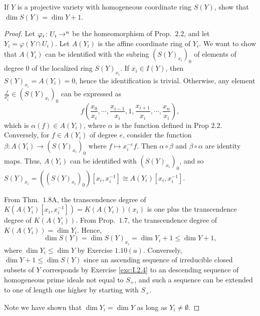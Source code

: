 \documentclass[10pt]{article}
\theoremstyle{definition}
\theoremstyle{remark}
\numberwithin{equation}{section}
\numberwithin{figure}{subsubsection}
\let\AA\relax
\DeclareMathOperator{\AA}{\mathbf{A}}
\begin{document}
\begin{problem}\label{exc:I.2.6}
  If $Y$ is a projective variety with homogeneous coordinate ring $S(Y)$, show that $\dim S(Y) = \dim Y + 1$. 
\end{problem}
\begin{proof}
  Let $\varphi_i\colon U_i \to \AA^n$ be the homeomorphism of Prop.~$2.2$, and
  let $Y_i = \varphi(Y \cap U_i)$.
  Let $A(Y_i)$ is the affine coordinate ring of $Y_i$.
  We want to show that $A(Y_i)$ can be identified with the subring
  $(S(Y)_{x_i})_0$ of elements of degree $0$ of the localized ring $S(Y)_{x_i}$.
  If $x_i \in I(Y)$, then $S(Y)_{x_i} = A(Y_i) = 0$, hence the identification is
  trivial. Otherwise, any element $\frac{f}{x_i^e} \in (S(Y)_{x_i})_0$ can be
  expressed as
  \[
    f\left(\frac{x_0}{x_i}, \cdots, \frac{x_{i-1}}{x_i}, 1, \frac{x_{i+1}}{x_i},
    \cdots, \frac{x_n}{x_i}\right),
  \]
  which is $\alpha(f) \in A(Y_i)$, where $\alpha$ is the function defined in Prop
  $2.2$. Conversely, for $f \in A(Y_i)$ of degree $e$, consider the function
  $\beta\colon A(Y_i) \to (S(Y)_{x_i})_0$ where $f \mapsto x_i^{-e}f$. Then
  $\alpha \circ \beta$ and $\beta \circ \alpha$ are identity maps. Thus,
  $A(Y_i)$ can be identified with $(S(Y)_{x_i})_0$, and so $S(Y)_{x_i} =
  ((S(Y)_{x_i})_0)[x_i, x_i^{-1}] \cong A(Y_i)[x_i, x_i^{-1}]$.
  \par From Thm.~$1.8$A, the transcendence degree of $K(A(Y_i)[x_i, x_i^{-1}]) =
  K(A(Y_i))(x_i)$ is one plus the transcendence degree of $K(A(Y_i))$. From
  Prop.~$1.7$, the transcendence degree of $K(A(Y_i)) = \dim Y_i$. Hence,  
  \[\dim S(Y) = \dim S(Y)_{x_i} = \dim Y_i + 1 \le \dim Y+1,\]
  where $\dim Y_i \le \dim Y$ by Exercise $1.10(a)$. Conversely, $\dim Y + 1 \le
  \dim S(Y)$ since an ascending sequence of irreducible closed subsets of $Y$
  corresponds by Exercise \ref{exc:I.2.4} to an descending sequence of
  homogeneous prime ideals not equal to $S_+$, and such a sequence can be
  extended to one of length one higher by starting with $S_+$.
  \par Note we have shown that $\dim Y_i = \dim Y$ as long as $Y_i \ne
  \emptyset$.
\end{proof}
\end{document}
